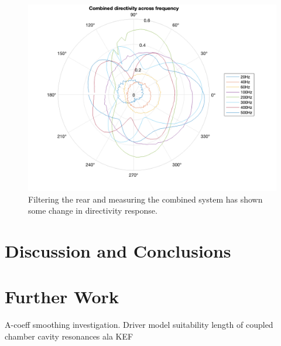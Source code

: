 \documentclass{report}
\begin{document}
        \begin{figure}[H]
            \centering
            \includegraphics[width=0.7\linewidth]{figs/filteredCombinedDirectivity.png}
            \caption{Filtering the rear and measuring the combined system has shown some change in directivity response.}
            \label{filteredCombinedDirectivity}
        \end{figure}

\chapter{Discussion and Conclusions}

\chapter{Further Work}
    A-coeff smoothing investigation.
    Driver model suitability
    length of coupled chamber
    cavity resonances ala KEF



\end{document}
